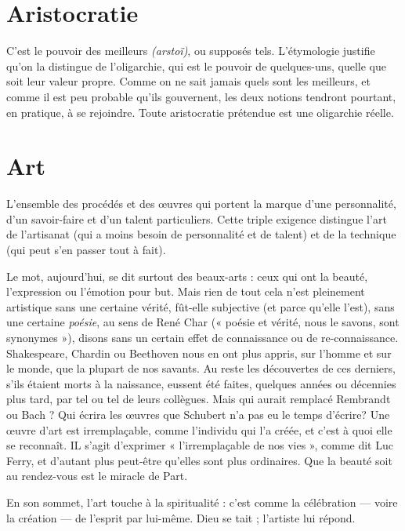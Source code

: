 \section{Aristocratie}
C’est le pouvoir des meilleurs {\it (arstoï)}, ou supposés tels.
L'étymologie justifie qu’on la distingue de l’oligarchie, qui
est le pouvoir de quelques-uns, quelle que soit leur valeur propre. Comme on
ne sait jamais quels sont les meilleurs, et comme il est peu probable qu’ils gouvernent,
les deux notions tendront pourtant, en pratique, à se rejoindre. Toute
aristocratie prétendue est une oligarchie réelle.

\section{Art}
L'ensemble des procédés et des œuvres qui portent la marque d’une
personnalité, d’un savoir-faire et d’un talent particuliers. Cette triple
exigence distingue l’art de l'artisanat (qui a moins besoin de personnalité et de
talent) et de la technique (qui peut s’en passer tout à fait).

Le mot, aujourd’hui, se dit surtout des beaux-arts : ceux qui ont la beauté,
l'expression ou l'émotion pour but. Mais rien de tout cela n’est pleinement
artistique sans une certaine vérité, fût-elle subjective (et parce qu’elle l’est),
sans une certaine {\it poésie}, au sens de René Char (« poésie et vérité, nous le
savons, sont synonymes »), disons sans un certain effet de connaissance ou de
re-connaissance. Shakespeare, Chardin ou Beethoven nous en ont plus appris,
sur l’homme et sur le monde, que la plupart de nos savants. Au reste les découvertes
de ces derniers, s’ils étaient morts à la naissance, eussent été faites,
quelques années ou décennies plus tard, par tel ou tel de leurs collègues. Mais
qui aurait remplacé Rembrandt ou Bach ? Qui écrira les œuvres que Schubert
n'a pas eu le temps d'écrire? Une œuvre d’art est irremplaçable, comme
l'individu qui l’a créée, et c’est à quoi elle se reconnaît. IL s’agit d’exprimer
« l’irremplaçable de nos vies », comme dit Luc Ferry, et d’autant plus peut-être
qu'elles sont plus ordinaires. Que la beauté soit au rendez-vous est le miracle de
Part.

En son sommet, l’art touche à la spiritualité : c’est comme la célébration —
voire la création — de l'esprit par lui-même. Dieu se tait ; l’artiste lui répond.


